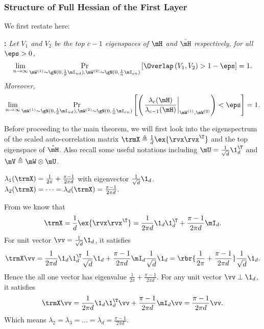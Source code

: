 \subsubsection{Structure of Full Hessian of the First Layer}
\label{sec:proof-full-hessian}
We first restate  here:

\noindent\textbf{:}\emph{
Let $V_1$ and $V_2$ be the top $c-1$ eigenspaces of $\mH$ and $\hat\mH$ respectively, for all $\eps>0$, 
\begin{equation}
    \lim_{n\to\infty}\mathop{\Pr}_{\mW^{(1)}\sim\gN(0,\frac{1}{d}\mI_{nd}), \mW^{(2)}\sim\gN(0,\frac{1}{n}\mI_{cn})}\left[\Overlap\left(V_1,V_2\right)>1-\eps\right] = 1.
\end{equation}
Moreover, \begin{equation}
    \lim_{n\to\infty}\mathop{\Pr}_{\mW^{(1)}\sim\gN(0,\frac{1}{d}\mI_{nd}), \mW^{(2)}\sim\gN(0,\frac{1}{n}\mI_{cn})}\left[\left(\left.\frac{\lambda_c(\mH)}{\lambda_{c-1}(\mH)}\right|_{\mW^{(1)}, \mW^{(2)}}\right) < \eps\right] = 1.
\end{equation}
}

Before proceeding to the main theorem, we will first look into the eigenspectrum of the scaled auto-correlation matrix $\trmX\triangleq \frac1d\ex{\rvx\rvx^\T}$ and the top eigenspace of $\hat\mH$. Also recall some useful notations including $\mU=\frac{1}{\sqrt{d}}\1_d^\T$ and $\mV\triangleq \mW\otimes\mU$.

\begin{lemma}
\label{lemma:X-structure}
$\lambda_1(\trmX)=\frac{1}{2\pi}+\frac{\pi - 1}{2\pi d}$ with eigenvector $\frac{1}{\sqrt{d}}\1_d$. $\lambda_2(\trmX)=\dots=\lambda_d(\trmX)=\frac{\pi - 1}{2\pi d}.$
\end{lemma}

\begin{proofof}{}
From  we know that \begin{equation}
    \trmX=\frac1d\ex{\rvx\rvx^\T}=\frac{1}{2\pi d}\1_d\1_d^\T+\frac{\pi - 1}{2\pi d}\mI_d.
\end{equation}
For unit vector $\vv=\frac{1}{\sqrt{d}}\1_d$, it satisfies
\begin{equation}
\begin{split}
    \trmX\vv = \frac{1}{2\pi d}\1_d\1_d^\T\frac{1}{\sqrt{d}}\1_d +\frac{\pi - 1}{2\pi d}\mI_d \frac{1}{\sqrt{d}}\1_d = \rbr{\frac{1}{2\pi}+\frac{\pi - 1}{2\pi d}} \frac{1}{\sqrt{d}}\1_d.
\end{split}
\end{equation}
Hence the all one vector has eigenvalue $\frac{1}{2\pi}+\frac{\pi - 1}{2\pi d}$.
For any unit vector $\vv\perp \1_d$, it satisfies
\begin{equation}
\begin{split}
    \trmX\vv = \frac{1}{2\pi d}\1_d\1_d^\T \vv +\frac{\pi - 1}{2\pi d}\mI_d\vv = \frac{\pi - 1}{2\pi d}\vv.
\end{split}
\end{equation}
Which means $\lambda_2=\lambda_3=\dots=\lambda_d=\frac{\pi - 1}{2\pi d}$.
\end{proofof}

